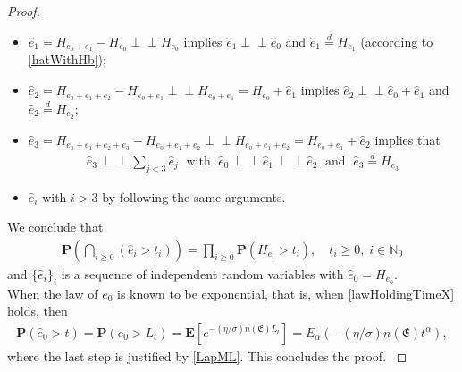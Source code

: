 \documentclass[11pt,a4paper]{article}
\newcommand{\magenta}{black}
\newcommand{\indep}{\perp \! \! \! \perp}
\begin{document}
\begin{proof}
\begin{itemize}
\item[-] $\hat{e}_1 = H_{e_0+e_1} - H_{e_0} \indep H_{e_0}$ implies $\hat{e}_1 \indep \hat{e}_0$ and $\hat{e}_1 \stackrel{d}{=} H_{e_1}$ (according to \eqref{hatWithHb});\\
\item[-] $\hat{e}_2 = H_{e_0+e_1+e_2} - H_{e_0+e_1} \indep H_{e_0+e_1} = H_{e_0} + \hat{e}_1$ implies $\hat{e}_2 \indep \hat{e}_0 + \hat{e}_1$ and $\hat{e}_2 \stackrel{d}{=} H_{e_2}$; \\
\item[-] $\hat{e}_3 = H_{e_0+e_1+e_2 + e_3} - H_{e_0+e_1+e_2} \indep H_{e_0+e_1+e_2} = H_{e_0+e_1} + \hat{e}_2$
implies that
\begin{align*}
\hat{e}_3 \indep \sum_{j < 3} \hat{e}_j \; \textrm{ with } \; \hat{e}_0 \indep \hat{e}_1 \indep \hat{e}_2 \; \textrm{ and } \; \hat{e}_3 \stackrel{d}{=} H_{e_3}
\end{align*}
\item[-] $\hat{e}_i$ with $i >3$ by following the same arguments. 
\end{itemize}
We conclude that 
\begin{align}
\mathbf{P}\left( \bigcap_{i \geq 0} (\hat{e}_i > t_i) \right) = \prod_{i \geq 0} \mathbf{P}(H_{e_i} > t_i), \quad t_i \geq 0, \; i \in \mathbb{N}_0
\end{align}
and $\{\hat{e}_i\}_i$ is a sequence of independent random variables with $\hat{e}_0 = H_{e_0}$.\\

{\color{\magenta} When the law of $e_0$ is known to be exponential, that is, when \eqref{lawHoldingTimeX} holds, then 
\begin{align*}
\mathbf{P}(\hat{e}_0 > t) = \mathbf{P}(e_0 > L_t) = \mathbf{E} [ e^{-(\eta/\sigma) n(\mathfrak{E}) L_t} ] = E_\alpha(-(\eta/\sigma) n(\mathfrak{E}) t^\alpha),
\end{align*}
where the last step is justified by \eqref{LapML}. This concludes the proof.
}

\end{proof}
\end{document}
